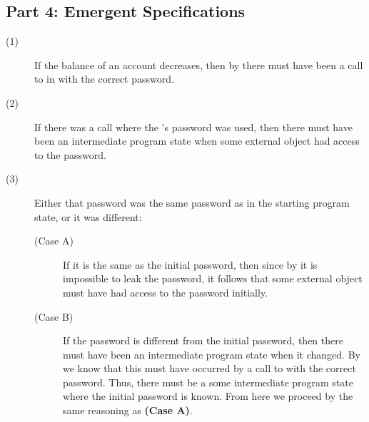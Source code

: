 \subsection{Part 4: Emergent \Nec Specifications}
\begin{description}
\item [(1)]
If the balance of an account decreases, then
by  there must have been a call
to  in  with the correct password.
\item [(2)]
If there was a call where the 's password 
was used, then there must have been an intermediate program state
when some external object had access to the password.
\item [(3)]
Either that password was the same password as in the starting 
program state, or it was different:
\begin{description}
\item [(Case A)]
If it is the same as the initial password, then since by 
it is impossible to leak the password, it follows that some external object 
must have had access to the password initially.
\item [(Case B)]
If the password is different from the initial password, 
then there must have been an intermediate program state when it 
changed. By  we know that this must have occurred
by a call to  with the correct password. Thus,
there must be a some intermediate program state where the initial
password is known. From here we proceed by the same reasoning 
as \textbf{(Case A)}.
\end{description}
\end{description}

